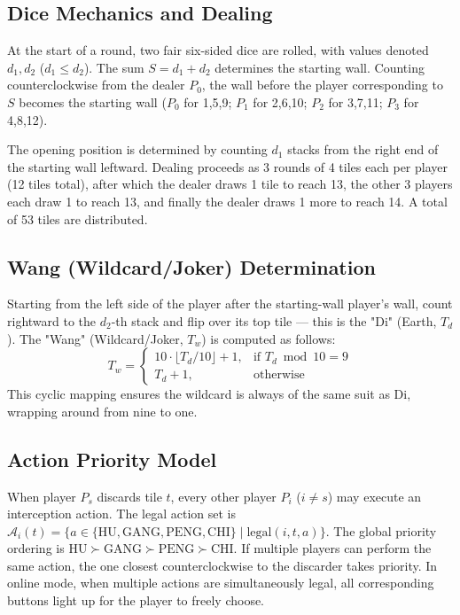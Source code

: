 \documentclass[11pt,a4paper]{article}
\begin{document}
\subsection{Dice Mechanics and Dealing}

At the start of a round, two fair six-sided dice are rolled, with values denoted $d_1, d_2$ ($d_1 \leq d_2$). The sum $S = d_1 + d_2$ determines the starting wall. Counting counterclockwise from the dealer $P_0$, the wall before the player corresponding to $S$ becomes the starting wall ($P_0$ for 1,5,9; $P_1$ for 2,6,10; $P_2$ for 3,7,11; $P_3$ for 4,8,12).

The opening position is determined by counting $d_1$ stacks from the right end of the starting wall leftward. Dealing proceeds as 3 rounds of 4 tiles each per player (12 tiles total), after which the dealer draws 1 tile to reach 13, the other 3 players each draw 1 to reach 13, and finally the dealer draws 1 more to reach 14. A total of 53 tiles are distributed.

\subsection{Wang (Wildcard/Joker) Determination}

Starting from the left side of the player after the starting-wall player's wall, count rightward to the $d_2$-th stack and flip over its top tile — this is the "Di" (Earth, $T_d$). The "Wang" (Wildcard/Joker, $T_w$) is computed as follows:
\begin{equation}
  T_w = \begin{cases}
    10\cdot\lfloor T_d/10\rfloor + 1, & \text{if } T_d \bmod 10 = 9 \\
    T_d + 1, & \text{otherwise}
  \end{cases}
\end{equation}
This cyclic mapping ensures the wildcard is always of the same suit as Di, wrapping around from nine to one.

\subsection{Action Priority Model}

When player $P_s$ discards tile $t$, every other player $P_i$ ($i \neq s$) may execute an interception action. The legal action set is $\mathcal{A}_i(t) = \{a \in \{\text{HU}, \text{GANG}, \text{PENG}, \text{CHI}\} \mid \text{legal}(i,t,a)\}$. The global priority ordering is $\text{HU} \succ \text{GANG} \succ \text{PENG} \succ \text{CHI}$. If multiple players can perform the same action, the one closest counterclockwise to the discarder takes priority. In online mode, when multiple actions are simultaneously legal, all corresponding buttons light up for the player to freely choose.
\end{document}
